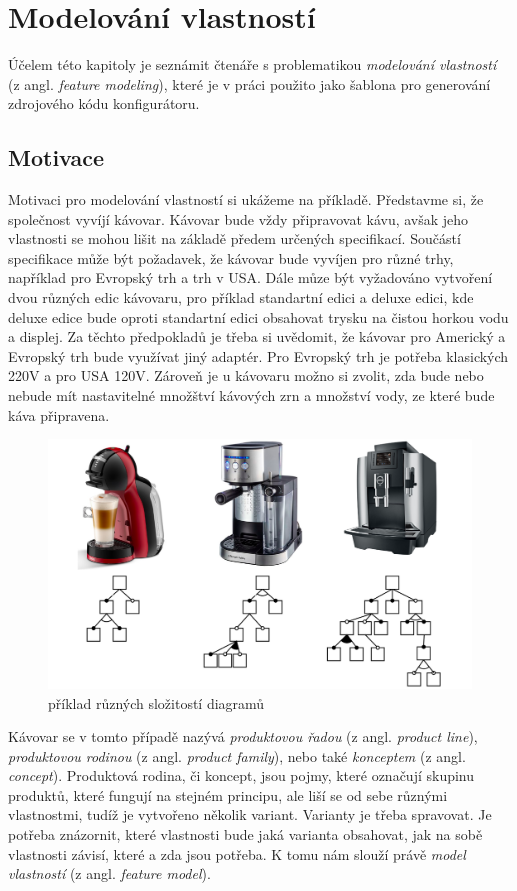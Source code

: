 \chapter{Modelování vlastností}

Účelem této kapitoly je seznámit čtenáře s problematikou \textit{modelování vlastností} (z angl. \textit{feature modeling}), které je v práci použito jako šablona pro generování zdrojového kódu konfigurátoru.

\section{Motivace}

Motivaci pro modelování vlastností si ukážeme na příkladě. Představme si, že společnost vyvíjí kávovar. Kávovar bude vždy připravovat kávu, avšak jeho vlastnosti se mohou lišit na základě předem určených specifikací. Součástí specifikace může být požadavek, že kávovar bude vyvíjen pro různé trhy, například pro Evropský trh a trh v USA. Dále můze být vyžadováno vytvoření dvou různých edic kávovaru, pro příklad standartní edici a deluxe edici, kde deluxe edice bude oproti standartní edici obsahovat trysku na čistou horkou vodu a displej. Za těchto předpokladů je třeba si uvědomit, že kávovar pro Americký a Evropský trh bude využívat jiný adaptér. Pro Evropský trh je potřeba klasických 220V a pro USA 120V. Zároveň je u kávovaru možno si zvolit, zda bude nebo nebude mít nastavitelné množštví kávových zrn a množství vody, ze které bude káva připravena.

\begin{figure}[H]
	\centering
	\includegraphics[width=13cm]{images/coffee}
	\caption{příklad různých složitostí diagramů}
\end{figure}


Kávovar se v tomto případě nazývá \textit{produktovou řadou} (z angl. \textit{product line}), \textit{produktovou rodinou} (z angl. \textit{product family}), nebo také \textit{konceptem} (z angl. \textit{concept}). Produktová rodina, či koncept, jsou pojmy, které označují skupinu produktů, které fungují na stejném principu, ale liší se od sebe různými vlastnostmi, tudíž je vytvořeno několik variant. Varianty je třeba spravovat. Je potřeba znázornit, které vlastnosti bude jaká varianta obsahovat, jak na sobě vlastnosti závisí, které a zda jsou potřeba. K tomu nám slouží právě \textit{model vlastností} (z angl. \textit{feature model}).

